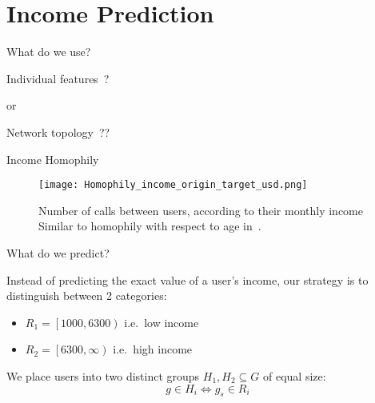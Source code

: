 \documentclass[usenames,dvipsnames]{beamer}
\newcommand{\closeopen}[2]{\left[ #1, #2 \right)}
\begin{document}
\section{Income Prediction}

\begin{frame}{What do we use?}

\centering

\begin{LARGE}
Individual features~?

\bigskip

or

\bigskip
\medskip

Network topology~??
\end{LARGE}
\end{frame}


\begin{frame}{Income Homophily}

\begin{figure}[h]
\begin{center}
\texttt{[image: Homophily\_income\_origin\_target\_usd.png]}
\caption{Number of calls between users, according to their monthly income \\
\medskip
{\small Similar to homophily with respect to age in~\cite{brea2014}.}
}
\label{homophily_heatmap}
\end{center}
\end{figure}
\end{frame}

\begin{frame}{What do we predict?}

Instead of predicting the exact value of a user's income, our strategy is to distinguish between 2 categories:
\begin{itemize}
\item $R_1 = \closeopen{1000}{6300}$ i.e.\ low income
\item $R_2 = \closeopen{6300}{\infty}$ i.e.\ high income
\end{itemize} 

\bigskip

We place users into two distinct groups $ H_1, H_2 \subseteq G$ of equal size:
\[
	g \in H_i \iff g_s \in R_i
\]

\end{frame}
\end{document}
